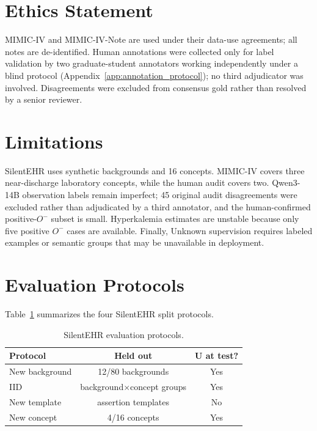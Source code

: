 \documentclass[11pt]{article}
\begin{document}
\section*{Ethics Statement}
MIMIC-IV and MIMIC-IV-Note are used under their data-use agreements; all notes
are de-identified. Human annotations were collected only for label validation
by two graduate-student annotators working independently under a blind protocol
(Appendix~\ref{app:annotation_protocol}); no third adjudicator was involved.
Disagreements were excluded from consensus gold rather than resolved by a senior
reviewer.

\section*{Limitations}
SilentEHR uses synthetic backgrounds and 16 concepts. MIMIC-IV covers three
near-discharge laboratory concepts, while the human audit covers two.
Qwen3-14B observation labels remain imperfect; 45 original audit disagreements
were excluded rather than adjudicated by a third annotator, and the
human-confirmed positive-$O^-$ subset is small.
Hyperkalemia estimates are unstable because only five positive $O^-$ cases are
available. Finally, Unknown supervision requires labeled examples or semantic
groups that may be unavailable in deployment.




\appendix
\section{Evaluation Protocols}
\label{app:protocols}
Table~\ref{tab:protocols} summarizes the four SilentEHR split protocols.

\begin{table}[!htbp]
  \centering
  \footnotesize
  \renewcommand{\arraystretch}{1.08}
  \caption{SilentEHR evaluation protocols.}
  \label{tab:protocols}
  \begin{tabular*}{\columnwidth}{@{\extracolsep{\fill}}lcc@{}}
    \toprule
    \textbf{Protocol} & \textbf{Held out} & \textbf{U at test?} \\
    \midrule
    New background & 12/80 backgrounds & Yes \\
    IID & background$\times$concept groups & Yes \\
    New template & assertion templates & No \\
    New concept & 4/16 concepts & Yes \\
    \bottomrule
  \end{tabular*}
\end{table}
\end{document}
